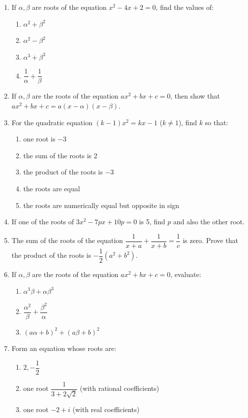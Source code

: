 \documentclass[12pt,a4paper]{article}
\begin{document}
	
	\begin{enumerate}
		\item If $\alpha, \beta$ are roots of the equation $x^2 - 4x + 2 = 0$, find the values of:
		\begin{enumerate}[label=(\roman*)]
			\item $\alpha^2 + \beta^2$
			\item $\alpha^2 - \beta^2$
			\item $\alpha^3 + \beta^3$
			\item $\dfrac{1}{\alpha} + \dfrac{1}{\beta}$
		\end{enumerate}
		
		\item If $\alpha, \beta$ are the roots of the equation $ax^2 + bx + c = 0$, then show that $ax^2 + bx + c = a(x - \alpha)(x - \beta)$.
		
		\item For the quadratic equation $(k-1)x^2 = kx - 1$ ($k \neq 1$), find $k$ so that:
		\begin{enumerate}[label=(\roman*)]
			\item one root is $-3$
			\item the sum of the roots is 2
			\item the product of the roots is $-3$
			\item the roots are equal
			\item the roots are numerically equal but opposite in sign
		\end{enumerate}
		
		\item If one of the roots of $3x^2 - 7px + 10p = 0$ is 5, find $p$ and also the other root.
		
		\item The sum of the roots of the equation $\dfrac{1}{x+a} + \dfrac{1}{x+b} = \dfrac{1}{c}$ is zero. Prove that the product of the roots is $-\dfrac{1}{2}(a^2 + b^2)$.
		
		\item If $\alpha, \beta$ are the roots of the equation $ax^2 + bx + c = 0$, evaluate:
		\begin{enumerate}[label=(\roman*)]
			\item $\alpha^3\beta + \alpha\beta^3$
			\item $\dfrac{\alpha^2}{\beta} + \dfrac{\beta^2}{\alpha}$
			\item $(a\alpha + b)^2 + (a\beta + b)^2$
		\end{enumerate}
		
		\item Form an equation whose roots are:
		\begin{enumerate}[label=(\roman*)]
			\item $2, -\dfrac{1}{2}$
			\item one root $\dfrac{1}{3 + 2\sqrt{2}}$ (with rational coefficients)
			\item one root $-2 + i$ (with real coefficients)
		\end{enumerate}
		

\end{enumerate}
\end{document}
